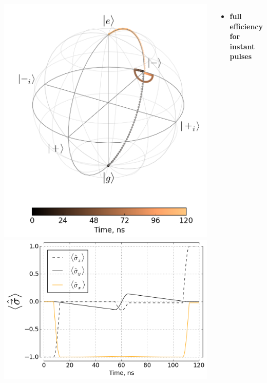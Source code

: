 \documentclass[aspectratio=169, 13pt, t]{beamer}
\begin{document}
\begin{frame}[t]
{	\vspace{0.2cm}
	\begin{columns}[c]
	\includegraphics[width=\textwidth]{cse_bloch_rf}
	\includegraphics[width=\textwidth]{cse_xyz_rf}
	
	
	\vspace{-0.3cm}
	\begin{itemize}
	\centering	
	\item \bf full efficiency for instant pulses
	\end{itemize}
	\end{columns}
}
\end{frame}
\end{document}
